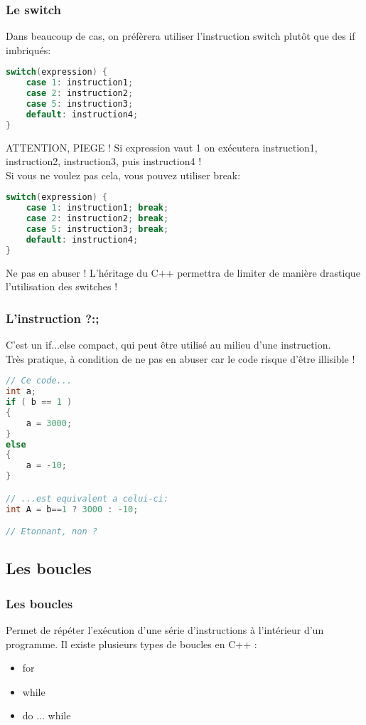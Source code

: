 \documentclass{beamer}
\begin{document}
\begin{frame}[fragile=singleslide,shrink=20]
\frametitle {Le switch}

Dans beaucoup de cas, on préfèrera utiliser l'instruction switch plutôt que des if imbriqués:
\begin{lstlisting}[language=c++]
switch(expression) {
    case 1: instruction1;
    case 2: instruction2;
    case 5: instruction3;
    default: instruction4;
}
\end{lstlisting}

\begin{block}{ATTENTION, PIEGE !}
Si expression vaut 1 on exécutera instruction1, instruction2, instruction3, puis instruction4 ! \\
Si vous ne voulez pas cela, vous pouvez utiliser break:
\begin{lstlisting}[language=c++]
switch(expression) {
    case 1: instruction1; break;
    case 2: instruction2; break;
    case 5: instruction3; break;
    default: instruction4;
}
\end{lstlisting}
\end{block}

\begin{block}{Ne pas en abuser !}
L'héritage du C++ permettra de limiter de manière drastique l'utilisation des switches !
\end{block}
\end{frame}

\begin{frame}[fragile=singleslide,shrink=20]
\frametitle {L'instruction ?:;}
C'est un if...else compact, qui peut être utilisé au milieu d'une instruction. \\
Très pratique, à condition de ne pas en abuser car le code risque d'être illisible !

\begin{lstlisting}[language=c++]
// Ce code...
int a;
if ( b == 1 )
{
    a = 3000;
}
else
{
    a = -10;
}

// ...est equivalent a celui-ci:
int A = b==1 ? 3000 : -10;

// Etonnant, non ?
\end{lstlisting}
\end{frame}

\subsection{Les boucles}

\begin{frame}[fragile=singleslide,shrink=20]
\frametitle {Les boucles}

Permet de répéter l'exécution d'une série d'instructions à l'intérieur d'un programme. 
Il existe plusieurs types de boucles en C++ :
\begin{itemize}
\item{for}
\item{while}
\item{do ... while}
\end{itemize}

\end{frame}
\end{document}
